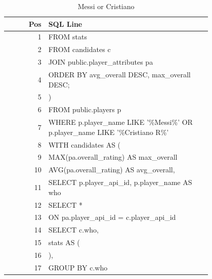\documentclass{article}
\begin{document}
\begin{table}[t]
  \centering
  \caption{Messi or Cristiano}
  \label{tab:messi-cristiano}
  \begin{tabular}{ r p{0.8\linewidth}}
    \toprule
    \textbf{Pos}
    & \textbf{SQL Line} \\
    \midrule
    1
    & FROM stats \\
    2
    &   FROM candidates c \\
    3
    &   JOIN public.player\_attributes pa \\
    4
    & ORDER BY avg\_overall DESC, max\_overall DESC; \\
    5
    & ) \\
    6
    &   FROM public.players p \\
    7
    &   WHERE p.player\_name LIKE '\%Messi\%' OR p.player\_name LIKE '\%Cristiano R\%' \\
    8
    & WITH candidates AS ( \\
    9
    &          MAX(pa.overall\_rating) AS max\_overall \\
    10
    &          AVG(pa.overall\_rating) AS avg\_overall, \\
    11
    &   SELECT p.player\_api\_id, p.player\_name AS who \\
    12
    & SELECT *  \\
    13
    &   ON pa.player\_api\_id = c.player\_api\_id \\
    14
    &   SELECT c.who, \\
    15
    & stats AS ( \\
    16
    & ), \\
    17
    &   GROUP BY c.who \\
    \bottomrule
  \end{tabular}
\end{table}
\end{document}
